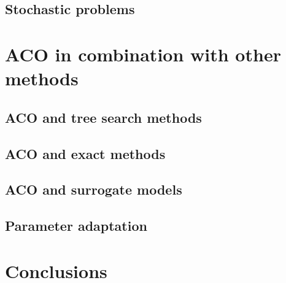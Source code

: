 \documentclass[12pt]{article}
\begin{document}
\subsection{Stochastic problems}

\section{ACO in combination with other methods}

\subsection{ACO and tree search methods}

\subsection{ACO and exact methods}

\subsection{ACO and surrogate models}

\subsection{Parameter adaptation}

\section{Conclusions}

\begin{thebibliography}{1}

\end{thebibliography}
\end{document}

